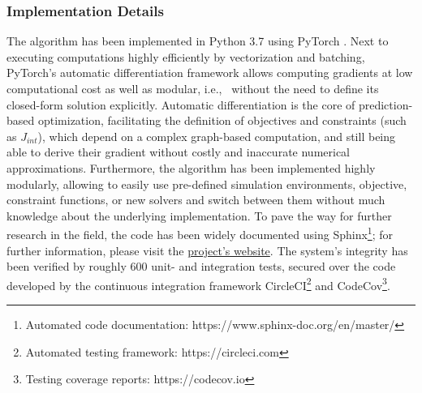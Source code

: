 
\subsubsection{Implementation Details} 
The algorithm has been implemented in Python 3.7 using PyTorch \cite{pytorch}. Next to executing computations highly efficiently by vectorization and batching, PyTorch's automatic differentiation framework allows computing gradients at low computational cost as well as modular, i.e., \ without the need to define its closed-form solution explicitly. Automatic differentiation is the core of prediction-based optimization, facilitating the definition of objectives and constraints (such as $J_{int}$), which depend on a complex graph-based computation, and still being able to derive their gradient without costly and inaccurate numerical approximations.
\newline 
Furthermore, the algorithm has been implemented highly modularly, allowing to easily use pre-defined simulation environments, objective, constraint functions, or new solvers and switch between them without much knowledge about the underlying implementation. To pave the way for further research in the field, the code has been widely documented using Sphinx\footnote{Automated code documentation: https://www.sphinx-doc.org/en/master/}; for further information, please visit the \href{https://simon-schaefer.github.io/mantrap/}{project's website}.
\newline
The system's integrity has been verified by roughly 600 unit- and integration tests, secured over the code developed by the continuous integration framework CircleCI\footnote{Automated testing framework: https://circleci.com} and CodeCov\footnote{Testing coverage reports: https://codecov.io}.
